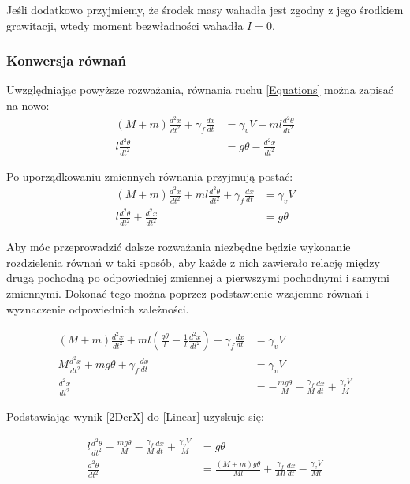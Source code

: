 \documentclass[12pt, twoside, openany]{report}
\theoremstyle{definition}
\begin{document}
Jeśli dodatkowo przyjmiemy, że środek masy wahadła jest zgodny z jego środkiem grawitacji, wtedy moment bezwładności wahadła $I = 0$.

\subsubsection{Konwersja równań}
Uwzględniając powyższe rozważania, równania ruchu \ref{Equations} można zapisać na nowo:
\begin{equation}
\begin{aligned}
(M + m) \frac{d^2x}{dt^2} + \gamma_f \frac{dx}{dt} &= \gamma_v V - ml \frac{d^2\theta}{dt^2}\\
l \frac{d^2\theta}{dt^2} &= g\theta - \frac{d^2x}{dt^2}
\end{aligned}
\end{equation}

Po uporządkowaniu zmiennych równania przyjmują postać:
\begin{equation} \label{Linear}
\begin{aligned}
(M + m) \frac{d^2x}{dt^2} + ml \frac{d^2\theta}{dt^2} +  \gamma_f \frac{dx}{dt} &= \gamma_v V\\
l \frac{d^2\theta}{dt^2} + \frac{d^2x}{dt^2} &= g\theta
\end{aligned}
\end{equation}

Aby móc przeprowadzić dalsze rozważania niezbędne będzie wykonanie rozdzielenia równań w taki sposób, aby każde z nich zawierało relację między drugą pochodną po odpowiedniej zmiennej a pierwszymi pochodnymi i samymi zmiennymi. Dokonać tego można poprzez podstawienie wzajemne równań i wyznaczenie odpowiednich zależności.

\begin{equation} \label{2DerX}
\begin{aligned}
(M + m) \frac{d^2x}{dt^2} + ml (\frac{g\theta}{l} - \frac{1}{l} \frac{d^2x}{dt^2}) +  \gamma_f \frac{dx}{dt} &= \gamma_v V\\
M \frac{d^2x}{dt^2} + mg \theta + \gamma_f \frac{dx}{dt} &= \gamma_v V\\
\frac{d^2x}{dt^2} &= -\frac{mg \theta}{M} - \frac{\gamma_f}{M} \frac{dx}{dt} + \frac{\gamma_v V}{M}
\end{aligned}
\end{equation}

Podstawiając wynik \ref{2DerX} do \ref{Linear} uzyskuje się:

\begin{equation}
\begin{aligned}
l \frac{d^2\theta}{dt^2} -\frac{mg \theta}{M} - \frac{\gamma_f}{M} \frac{dx}{dt} + \frac{\gamma_v V}{M} &= g\theta\\
\frac{d^2\theta}{dt^2} &= \frac{(M+m)g\theta}{Ml} + \frac{\gamma_f}{Ml}\frac{dx}{dt} - \frac{\gamma_vV}{Ml}
\end{aligned}
\end{equation}
\end{document}
